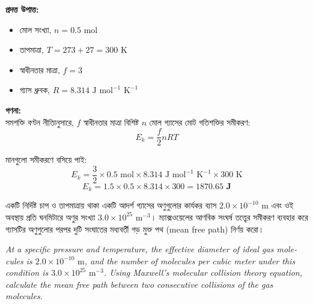 \documentclass[12pt, a4paper]{article}
\begin{document}
\begin{tcolorbox}[solutionbox={সমাধান (Solution)}]
    \noindent
    \textbf{প্রদত্ত উপাত্ত:}
    \begin{itemize}[leftmargin=1.5em, itemsep=0.2em]
        \item মোল সংখ্যা, $n = 0.5\text{ mol}$
        \item তাপমাত্রা, $T = 273 + 27 = 300\text{ K}$
        \item স্বাধীনতার মাত্রা, $f = 3$
        \item গ্যাস ধ্রুবক, $R = 8.314\text{ J mol}^{-1}\text{ K}^{-1}$
    \end{itemize}

    \vspace{0.6em}
    \noindent\textbf{গণনা:} \\
    সমশক্তি বণ্টন নীতিানুসারে, $f$ স্বাধীনতার মাত্রা বিশিষ্ট $n$ মোল গ্যাসের মোট গতিশক্তির সমীকরণ:
    \[ E_k = \frac{f}{2} n R T \]
    
    মানগুলো সমীকরণে বসিয়ে পাই:
    \[ E_k = \frac{3}{2} \times 0.5\text{ mol} \times 8.314\text{ J mol}^{-1}\text{ K}^{-1} \times 300\text{ K} \]
    \[ E_k = 1.5 \times 0.5 \times 8.314 \times 300 = \mathbf{1870.65\text{ J}} \]
\end{tcolorbox}


\begin{tcolorbox}[questionbox={প্রশ্ন (Question) 16}]
    \noindent
    একটি নির্দিষ্ট চাপ ও তাপমাত্রায় থাকা একটি আদর্শ গ্যাসের অণুগুলোর কার্যকর ব্যাস $2.0 \times 10^{-10}\text{ m}$ এবং ওই অবস্থায় প্রতি ঘনমিটারে অণুর সংখ্যা $3.0 \times 10^{25}\text{ m}^{-3}$। ম্যাক্সওয়েলের আণবিক সংঘর্ষ তত্ত্বের সমীকরণ ব্যবহার করে গ্যাসটির অণুগুলোর পরপর দুটি সংঘাতের মধ্যবর্তী গড় মুক্ত পথ (mean free path) নির্ণয় করো।
    
    \vspace{0.8em}
    \begin{english}
    \noindent\textit{\color{darkgray}
    At a specific pressure and temperature, the effective diameter of ideal gas molecules is $2.0 \times 10^{-10}\text{ m}$, and the number of molecules per cubic meter under this condition is $3.0 \times 10^{25}\text{ m}^{-3}$. Using Maxwell's molecular collision theory equation, calculate the mean free path between two consecutive collisions of the gas molecules.
    }
    \end{english}
\end{tcolorbox}
\end{document}
